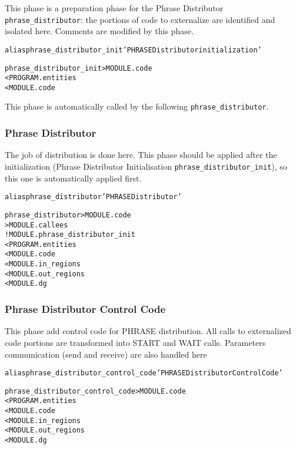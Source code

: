 \documentclass[a4paper]{report}
\newenvironment{PipsMake}{\begin{alltt}}{\end{alltt}}
\begin{document}
This phase is a preparation phase for the Phrase Distributor
\verb|phrase_distributor|: the portions of code to externalize are
identified and isolated here. Comments are modified by this phase.

\begin{PipsMake}
alias phrase_distributor_init 'PHRASE Distributor initialization'

phrase_distributor_init                  > MODULE.code
        < PROGRAM.entities
        < MODULE.code
\end{PipsMake}

This phase is automatically called by the following
\verb|phrase_distributor|.


\subsubsection{Phrase Distributor}

The job of distribution is done here. This phase should be applied after
the initialization (Phrase Distributor Initialisation
\verb|phrase_distributor_init|), so this one is automatically applied
first.

\begin{PipsMake}
alias phrase_distributor 'PHRASE Distributor'

phrase_distributor                       > MODULE.code
                                         > MODULE.callees
        ! MODULE.phrase_distributor_init
        < PROGRAM.entities
        < MODULE.code
        < MODULE.in_regions
        < MODULE.out_regions
        < MODULE.dg
\end{PipsMake}


\subsubsection{Phrase Distributor Control Code}

This phase add control code for PHRASE distribution. All calls to
externalized code portions are transformed into START and WAIT calls.
Parameters communication (send and receive) are also handled here

\begin{PipsMake}
alias phrase_distributor_control_code 'PHRASE Distributor Control Code'

phrase_distributor_control_code          > MODULE.code
        < PROGRAM.entities
        < MODULE.code
        < MODULE.in_regions
        < MODULE.out_regions
        < MODULE.dg
\end{PipsMake}
\end{document}
